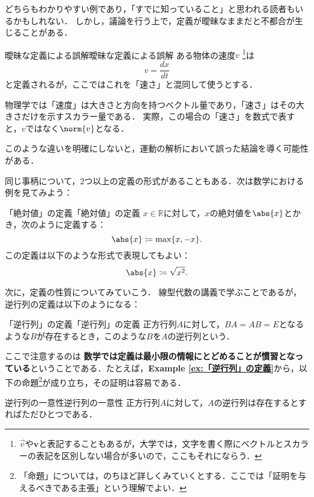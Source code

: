 \documentclass[a4paper,11pt]{ltjsarticle}
\renewcommand{\emph}[1]{\textbf{#1}}
\newcommand{\exref}[1]{{\bfseries\sffamily Example \ref{ex:#1}}}
\begin{document}
どちらもわかりやすい例であり，「すでに知っていること」と思われる読者もいるかもしれない．
しかし，議論を行う上で，定義が曖昧なままだと不都合が生じることがある．

\begin{example}{曖昧な定義による誤解}{曖昧な定義による誤解}
  ある物体の速度$v$ \footnote{$\vec{v}$や$\bm{v}$と表記することもあるが，大学では，文字を書く際にベクトルとスカラーの表記を区別しない場合が多いので，ここもそれにならう．}は
  \[
    v = \frac{dx}{dt}
  \]
  と定義されるが，ここではこれを「速さ」と混同して使うとする．

  物理学では「速度」は大きさと方向を持つベクトル量であり，「速さ」はその大きさだけを示すスカラー量である．
  実際，この場合の「速さ」を数式で表すと，$v$ではなく$\norm{v}$となる．

  このような違いを明確にしないと，運動の解析において誤った結論を導く可能性がある．
\end{example}

同じ事柄について，2つ以上の定義の形式があることもある．次は数学における例を見てみよう：

\begin{example}{「絶対値」の定義}{「絶対値」の定義}
  $ x \in \mathbb{R}$に対して，$x$の絶対値を$\abs{x}$とかき，次のように定義する：
  \[
    \abs{x} \coloneqq \max \{ x , -x \} .
  \]
  この定義は以下のような形式で表現してもよい：
  \[
    \abs{x} \coloneqq  \sqrt{x^2}.
  \]
\end{example}

次に，定義の性質についてみていこう．
線型代数の講義で学ぶことであるが，逆行列の定義は以下のようになる：

\begin{example}{「逆行列」の定義}{「逆行列」の定義}
  正方行列$A$に対して，$BA = AB =E$となるような$B$が存在するとき，このような$B$を$A$の逆行列という．
\end{example}


ここで注意するのは \emph{数学では定義は最小限の情報にとどめることが慣習となっている}ということである．たとえば，\exref{「逆行列」の定義}から，以下の命題\footnote{「命題」については，のちほど詳しくみていくとする．ここでは「証明を与えるべきである主張」という理解でよい．}が成り立ち，その証明は容易である．

\begin{prop}{逆行列の一意性}{逆行列の一意性}
  正方行列$A$に対して，$A$の逆行列は存在するとすればただひとつである．
\end{prop}
\end{document}
